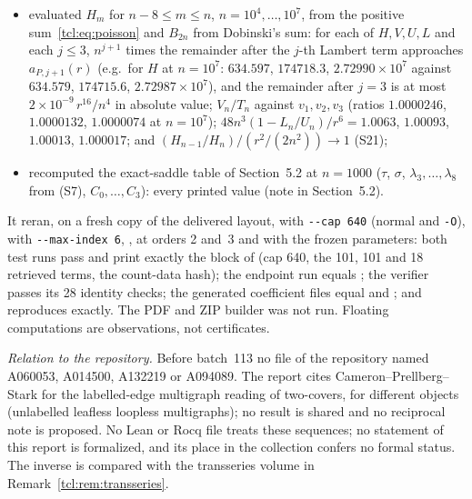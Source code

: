 \begin{writenote}
\begin{itemize}
\item evaluated $H_m$ for $n-8\le m\le n$, $n=10^4,\ldots,10^7$, from the
positive sum~\eqref{tcl:eq:poisson} and $B_{2n}$ from Dobinski's sum: for each
of $H,V,U,L$ and each $j\le3$, $n^{j+1}$ times the remainder after the
$j$-th Lambert term approaches $a_{P,j+1}(r)$ (e.g.\ for $H$ at $n=10^7$:
$634.597$, $174718.3$, $2.72990\times10^7$ against $634.579$, $174715.6$,
$2.72987\times10^7$), and the remainder after $j=3$ is at most
$2\times10^{-9}\,r^{16}/n^4$ in absolute value; $V_n/T_n$ against
$v_1,v_2,v_3$ (ratios $1.0000246$, $1.0000132$, $1.0000074$ at $n=10^7$);
$48n^3(1-L_n/U_n)/r^6=1.0063$, $1.00093$, $1.00013$, $1.000017$; and
$(H_{n-1}/H_n)/(r^2/(2n^2))\to1$ (S21);
\item recomputed the exact-saddle table of Section~5.2 at $n=1000$ ($\tau$,
$\sigma$, $\lambda_3,\ldots,\lambda_8$ from (S7), $C_0,\ldots,C_3$): every
printed value (note in Section~5.2).
\end{itemize}
It reran, on a fresh copy of the delivered layout, 
with \texttt{-{}-cap 640} (normal and \texttt{-O}), 
with \texttt{-{}-max-index 6},
,  at orders 2
and~3 and  with the frozen parameters:
both test runs pass and print exactly the  block of  (cap 640, the 101, 101 and 18 retrieved terms, the count-data hash); the endpoint run equals ; the verifier passes its 28 identity checks; the generated coefficient files equal  and ; and  reproduces  exactly. The PDF and ZIP builder was not run. Floating computations are
observations, not certificates.

\emph{Relation to the repository.} Before batch~113 no file of the repository
named A060053, A014500, A132219 or A094089. The report
 cites Cameron--Prellberg--Stark for the
labelled-edge multigraph reading of two-covers, for different objects
(unlabelled leafless loopless multigraphs); no result is shared and no
reciprocal note is proposed. No Lean or Rocq file treats these sequences; no
statement of this report is formalized, and its place in the collection
confers no formal status. The inverse is compared with the transseries volume
in Remark~\ref{tcl:rem:transseries}.
\end{writenote}
